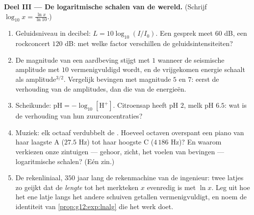 \begin{problem}
\medskip
\noindent\textbf{Deel III --- De logaritmische schalen van de wereld.}
(Schrijf $\log_{10} x = \frac{\ln x}{\ln 10}$.)
\begin{enumerate}[resume]
  \item Geluidsniveau in decibel: $L = 10 \log_{10}(I/I_0)$. Een gesprek meet
        $60$ dB, een rockconcert $120$ dB: met welke factor verschillen de
        geluidsintensiteiten?
  \item De magnitude van een aardbeving stijgt met $1$ wanneer de seismische
        amplitude met $10$ vermenigvuldigd wordt, en de vrijgekomen energie
        schaalt als amplitude$^{3/2}$. Vergelijk bevingen met magnitude $5$ en
        $7$: eerst de verhouding van de amplitudes, dan die van de energieën.
  \item Scheikunde: $\text{pH} = -\log_{10}[\mathrm{H^+}]$. Citroensap heeft
        pH $2$, melk pH $6.5$: wat is de verhouding van hun
        zuurconcentraties?
  \item Muziek: elk octaaf verdubbelt de . Hoeveel octaven
        overspant een piano van haar laagste A ($27.5$ Hz) tot haar hoogste C
        ($4\,186$ Hz)? En waarom verkiezen onze zintuigen --- gehoor, zicht,
        het voelen van bevingen --- logaritmische schalen? (Eén zin.)
  \item De rekenliniaal, $350$ jaar lang de rekenmachine van de ingenieur:
        twee latjes zo geijkt dat de \emph{lengte} tot het merkteken $x$
        evenredig is met $\ln x$. Leg uit hoe het ene latje langs het andere
        schuiven getallen vermenigvuldigt, en noem de identiteit van
        \cref{prop:g12:exp:lnalg} die het werk doet.
\end{enumerate}


\end{problem}

